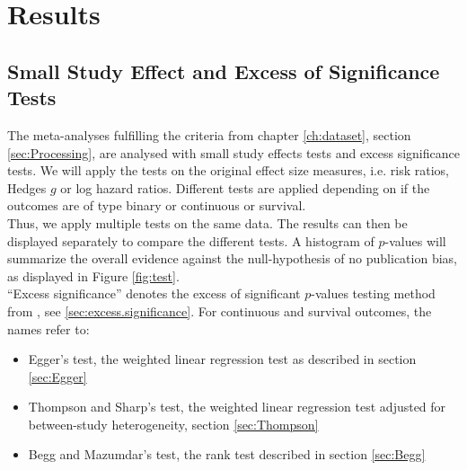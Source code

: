 






\chapter{Results} \label{ch:Results}


\section{Small Study Effect and Excess of Significance Tests} \label{sec:publication.bias.tests}




The meta-analyses fulfilling the criteria from chapter \ref{ch:dataset}, section \ref{sec:Processing}, are analysed with small study effects tests and excess significance tests. We will apply the tests on the original effect size measures, i.e. risk ratios, Hedges $g$ or log hazard ratios. Different tests are applied depending on if the outcomes are of type binary or continuous or survival.\\
Thus, we apply multiple tests on the same data. The results can then be displayed separately to compare the different tests. A histogram of $p$-values will summarize the overall evidence against the null-hypothesis of no publication bias, as displayed in Figure \ref{fig:test}. \\
``Excess significance'' denotes the excess of significant $p$-values testing method from \citet{excess.significance}, see \ref{sec:excess.significance}. For continuous and survival outcomes, the names refer to: 

\begin{itemize}
\item Egger's test, the weighted linear regression test as described in section \ref{sec:Egger}
\item Thompson and Sharp's test, the weighted linear regression test adjusted for between-study heterogeneity, section \ref{sec:Thompson}
\item Begg and Mazumdar's test, the rank test described in section \ref{sec:Begg}
\end{itemize}

